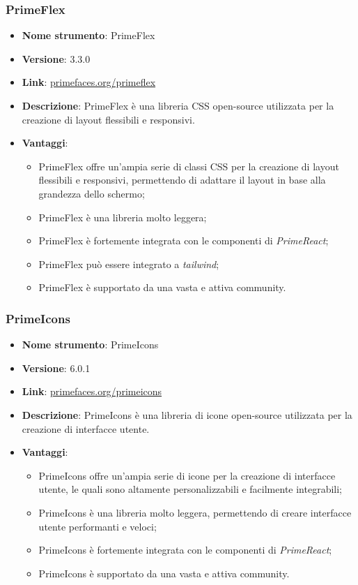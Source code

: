 \subsubsection{PrimeFlex}
\begin{itemize}
      \item \textbf{Nome strumento}: PrimeFlex
      \item \textbf{Versione}: 3.3.0
      \item \textbf{Link}: \href{https://primereact.org/}{primefaces.org/primeflex}
      \item \textbf{Descrizione}: PrimeFlex è una libreria CSS open-source utilizzata per la creazione di layout flessibili e responsivi.
      \item \textbf{Vantaggi}:
            \begin{itemize}
                  \item PrimeFlex offre un'ampia serie di classi CSS per la creazione di layout flessibili e responsivi, permettendo di adattare il layout
                        in base alla grandezza dello schermo;
                  \item PrimeFlex è una libreria molto leggera;
                  \item PrimeFlex è fortemente integrata con le componenti di \textit{PrimeReact};
                  \item PrimeFlex può essere integrato a \textit{tailwind};
                  \item PrimeFlex è supportato da una vasta e attiva community.
            \end{itemize}
\end{itemize}

\subsubsection{PrimeIcons}
\begin{itemize}
      \item \textbf{Nome strumento}: PrimeIcons
      \item \textbf{Versione}: 6.0.1
      \item \textbf{Link}: \href{https://primefaces.org/primeicons}{primefaces.org/primeicons}
      \item \textbf{Descrizione}: PrimeIcons è una libreria di icone open-source utilizzata per la creazione di interfacce utente.
      \item \textbf{Vantaggi}:
            \begin{itemize}
                  \item PrimeIcons offre un'ampia serie di icone per la creazione di interfacce utente, le quali sono altamente personalizzabili e facilmente integrabili;
                  \item PrimeIcons è una libreria molto leggera, permettendo di creare interfacce utente performanti e veloci;
                  \item PrimeIcons è fortemente integrata con le componenti di \textit{PrimeReact};
                  \item PrimeIcons è supportato da una vasta e attiva community.
            \end{itemize}
\end{itemize}

